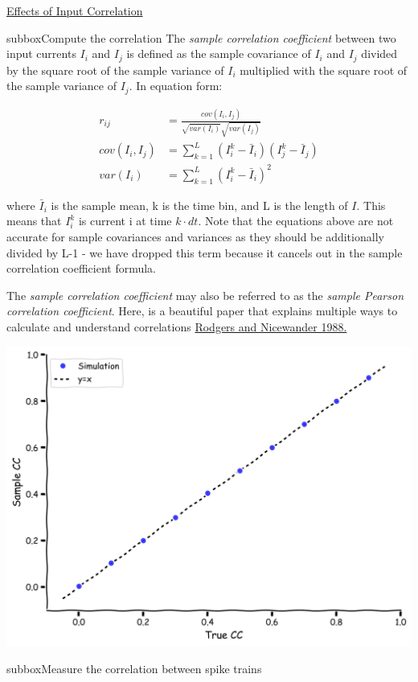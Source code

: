 \begin{textbox}{\href{https://compneuro.neuromatch.io/tutorials/W1D4_GeneralizedLinearModels/student/W1D4_Tutorial1.html}{Effects of Input Correlation } }
\begin{subbox}{subbox}{Compute the correlation}
\scriptsize
The \textit{sample correlation coefficient} between two input currents $I_i$ and $I_j$ is defined as the sample covariance of $I_i$ and $I_j$ divided by the square root of the sample variance of $I_i$ multiplied with the square root of the sample variance of $I_j$. In equation form:  

\begin{align}
r_{ij} &= \frac{cov(I_i, I_j)}{\sqrt{var(I_i)} \sqrt{var(I_j)}}\\
cov(I_i, I_j) &= \sum_{k=1}^L (I_i^k -\bar{I}_i)(I_j^k -\bar{I}_j) \\
var(I_i) &= \sum_{k=1}^L (I_i^k -\bar{I}_i)^2
\end{align}

where $\bar{I}_i$ is the sample mean, k is the time bin, and L is the length of $I$.  This means that $I_i^k$ is current i at time $k\cdot dt$. Note that the equations above are not accurate for sample covariances and variances as they should be additionally divided by L-1 - we have dropped this term because it cancels out in the sample correlation coefficient formula.

The \textit{sample correlation coefficient} may also be referred to as the \textit{sample Pearson correlation coefficient}. Here, is a beautiful paper that explains multiple ways to calculate and understand correlations \href{https://www.stat.berkeley.edu/~rabbee/correlation.pdf}{Rodgers and Nicewander 1988.}

\centering
\includegraphics[scale=0.1]{Figures/BNM/LIF_Figure5.png}
\end{subbox}
\begin{subbox}{subbox}{Measure the correlation between spike trains}
\scriptsize


\end{subbox}
\end{textbox}

